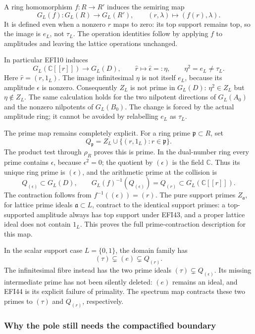 \documentclass[
  10pt,
  a4paper,
]{article}
\begin{document}
A ring homomorphism \(f:R\to R'\) induces the semiring map \[
G_L(f):G_L(R)\longrightarrow G_L(R'),\qquad
(r,\lambda)\longmapsto(f(r),\lambda).
\tag{EFI43}
\] It is defined even when a nonzero \(r\) maps to zero: its top support
remains top, so the image is \(e_L\), not \(\tau_L\). The operation
identities follow by applying \(f\) to amplitudes and leaving the
lattice operations unchanged.

In particular EFI10 induces \[
G_L(\mathbb C[[r]])\longrightarrow G_L(D),\qquad
\widehat r\longmapsto\widehat\epsilon=:\eta,
\qquad \eta^2=e_L\ne\tau_L.
\tag{EFI44}
\] Here \(\widehat r=(r,1_L)\). The image infinitesimal \(\eta\) is not
itself \(e_L\), because its amplitude \(\epsilon\) is nonzero.
Consequently \(Z_L\) is not prime in \(G_L(D)\): \(\eta^2\in Z_L\) but
\(\eta\notin Z_L\). The same calculation holds for the two nilpotent
directions of \(G_L(A_0)\) and the nonzero nilpotents of \(G_L(B_0)\).
The change is forced by the actual amplitude ring; it cannot be avoided
by relabelling \(e_L\) as \(\tau_L\).

The prime map remains completely explicit. For a ring prime
\(\mathfrak p\subset R\), set \[
Q_{\mathfrak p}=
Z_L\cup\{(r,1_L):r\in\mathfrak p\}.
\tag{EFI45}
\] The product test through \(\rho_R\) proves this is prime. In the
dual-number ring every prime contains \(\epsilon\), because
\(\epsilon^2=0\); the quotient by \((\epsilon)\) is the field
\(\mathbb C\). Thus its unique ring prime is \((\epsilon)\), and the
arithmetic prime at the collision is \[
Q_{(\epsilon)}\subset G_L(D),\qquad
G_L(f)^{-1}(Q_{(\epsilon)})=Q_{(r)}
\subset G_L(\mathbb C[[r]]).
\tag{EFI46}
\] The contraction follows from \(f^{-1}((\epsilon))=(r)\). The pure
support primes \(Z_{\mathfrak a}\), for lattice prime ideals
\(\mathfrak a\subset L\), contract to the identical support primes: a
top-supported amplitude always has top support under EFI43, and a proper
lattice ideal does not contain \(1_L\). This proves the full
prime-contraction description for this map.

In the scalar support case \(L=\{0,1\}\), the domain family has \[
(\tau)\subsetneq(e)\subsetneq Q_{(r)}.
\tag{EFI47}
\] The infinitesimal fibre instead has the two prime ideals
\((\tau)\subsetneq Q_{(\epsilon)}\). Its missing intermediate prime has
not been silently deleted: \((e)\) remains an ideal, and EFI44 is its
explicit failure of primality. The spectrum map contracts these two
primes to \((\tau)\) and \(Q_{(r)}\), respectively.

\subsubsection{Why the pole still needs the compactified
boundary}\label{why-the-pole-still-needs-the-compactified-boundary}
\end{document}
